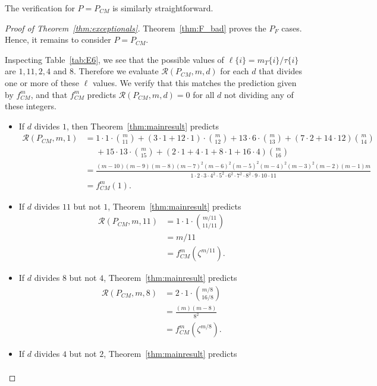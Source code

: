 \documentclass[12pt]{amsart}
\theoremstyle{definition}
\theoremstyle{remark}
\numberwithin{equation}{section}
\begin{document}
The verification for $P = P_{CM}$ is similarly straightforward. 

\begin{proof}[Proof of Theorem~\ref{thm:exceptionals}]
Theorem~\ref{thm:F_bad} proves the $P_F$ cases. Hence, it remains to consider $P = P_{CM}$.

Inspecting Table~\ref{tab:E6}, we see that the possible values of $\ell\{i\} = m_T\{i\}/\tau\{i\}$ are $1,11,2,4$ and $8$. Therefore we evaluate $\mathcal{R}(P_{CM},m,d)$ for each $d$ that divides one or more of these $\ell$ values. We verify that this matches the prediction given by $f^m_{CM}$, and that $f^m_{CM}$ predicts $\mathcal{R}(P_{CM},m,d) = 0$ for all $d$ not dividing any of these integers.
\begin{itemize}
\item If $d$ divides $1$, then Theorem~\ref{thm:mainresult} predicts 
\begin{align*}
\mathcal{R}(P_{CM},m,1) &= 1 \cdot 1 \cdot \binom{m}{11} + (3 \cdot 1  + 12 \cdot 1)  \cdot \binom{m}{12} + 13 \cdot 6 \cdot \binom{m}{13} + (7\cdot 2 + 14 \cdot 12) \binom{m}{14}  \\ &\ \ \ \ \ \ + 15 \cdot 13 \cdot \binom{m}{15} + (2 \cdot 1 + 4 \cdot 1 + 8 \cdot 1 + 16 \cdot 4) \binom{m}{16} \\
&= \frac{(m-10)(m-9)(m-8)(m-7)^2(m-6)^2(m-5)^2(m-4)^2(m-3)^2(m-2)(m-1)m}{1\cdot 2\cdot 3\cdot 4^2 \cdot 5^2 \cdot 6^2 \cdot 7^2 \cdot 8^2 \cdot 9 \cdot 10 \cdot 11} \\
&= f_{CM}^m(1).
\end{align*}
\item If $d$ divides $11$ but not $1$, Theorem~\ref{thm:mainresult} predicts
\begin{align*}
\mathcal{R}(P_{CM},m,11) &= 1 \cdot 1 \cdot \binom{m/11}{11/11} \\
&= m/11 \\ 
&= f_{CM}^m(\zeta^{m/11}).
\end{align*}
\item If $d$ divides $8$ but not $4$, Theorem~\ref{thm:mainresult} predicts
\begin{align*}
\mathcal{R}(P_{CM},m,8) &= 2 \cdot 1 \cdot \binom{m/8}{16/8} \\
&= \frac{(m)(m-8)}{8^2} \\
&= f_{CM}^m(\zeta^{m/8}).
\end{align*}
\item If $d$ divides $4$ but not $2$, Theorem~\ref{thm:mainresult} predicts
\begin{align*}

\end{align*}
\end{itemize}
\end{proof}
\end{document}
